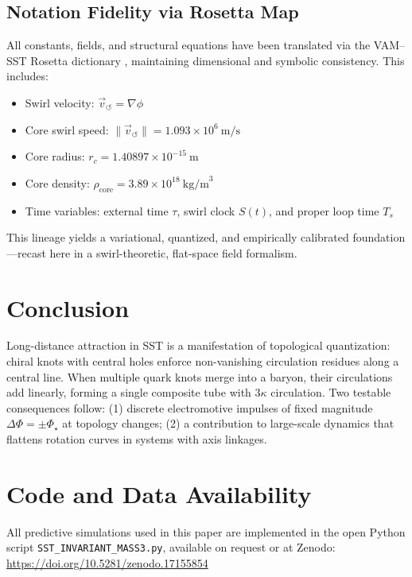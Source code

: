 \documentclass[reprint,aps,onecolumn,nofootinbib]{revtex4-2}
\begin{document}
    \subsection{Notation Fidelity via Rosetta Map}

        All constants, fields, and structural equations have been translated via the VAM–SST Rosetta dictionary \cite{vamrosetta2025}, maintaining dimensional and symbolic consistency. This includes:
        \begin{itemize}
            \item Swirl velocity: $ \vec{v}_{\circlearrowleft} = \nabla \phi $
            \item Core swirl speed: $ \|\vec{v}_{\circlearrowleft}\| = 1.093 \times 10^6\ \text{m/s} $
            \item Core radius: $ r_c = 1.40897 \times 10^{-15}\ \text{m} $
            \item Core density: $ \rho_{\text{core}} = 3.89 \times 10^{18}\ \text{kg/m}^3 $
            \item Time variables: external time $ \tau$, swirl clock $ S(t)$, and proper loop time $ T_s $
        \end{itemize}

        This lineage yields a variational, quantized, and empirically calibrated foundation—recast here in a swirl-theoretic, flat-space field formalism.

\section{Conclusion}

    Long-distance attraction in SST is a manifestation of topological quantization: chiral knots with central holes enforce non-vanishing circulation residues along a central line.
    When multiple quark knots merge into a baryon, their circulations add linearly, forming a single composite tube with $3\kappa$ circulation.
    Two testable consequences follow: (1) discrete electromotive impulses of fixed magnitude $\Delta\Phi=\pm\Phi_\star$ at topology changes; (2) a contribution to large-scale dynamics that flattens rotation curves in systems with axis linkages.


\section*{Code and Data Availability}
    All predictive simulations used in this paper are implemented in the open Python script \texttt{SST\_INVARIANT\_MASS3.py}, available on request or at Zenodo: \url{https://doi.org/10.5281/zenodo.17155854}
\end{document}

